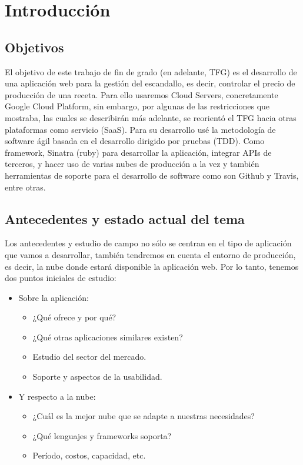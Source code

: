 \documentclass[a4paper,openright,14pt]{book}
\begin{document}
\chapter{Introducción}\label{intro}

\section{Objetivos}\label{cap.1.1}
El objetivo de este trabajo de fin de grado (en adelante, TFG) es el desarrollo de una aplicación web para la gestión del escandallo, es decir, controlar el precio de producción de una receta. Para ello usaremos Cloud Servers, concretamente Google Cloud Platform, sin embargo, por algunas de las restricciones que mostraba, las cuales se describirán más adelante, se reorientó el TFG hacia otras plataformas como servicio (SaaS). Para su desarrollo usé la metodología de software ágil basada en el desarrollo dirigido por pruebas (TDD). Como framework, Sinatra (ruby) para desarrollar la aplicación, integrar APIs de terceros, y hacer uso de varias nubes de producción a la vez y también herramientas de soporte para el desarrollo de software como son Github y Travis, entre otras.

\vspace*{0.2in}
\section{Antecedentes y estado actual del tema}\label{cap.1.2}
Los antecedentes y estudio de campo no sólo se centran en el tipo de aplicación que vamos a desarrollar, también tendremos en cuenta el entorno de producción, es decir, la nube donde estará disponible la aplicación web. Por lo tanto, tenemos dos puntos iniciales de estudio: 
\begin{itemize}
	\item Sobre la aplicación: 
	\begin{itemize}
		\item ¿Qué ofrece y por qué? 
		\item ¿Qué otras aplicaciones similares existen?
		\item Estudio del sector del mercado.
		\item Soporte y aspectos de la usabilidad.
	\end{itemize}

	\item Y respecto a la nube:
	\begin{itemize}
		\item ¿Cuál es la mejor nube que se adapte a nuestras necesidades?
		\item ¿Qué lenguajes y frameworks soporta?
		\item Período, costos, capacidad, etc.
	\end{itemize}
\end{itemize}
\end{document}
